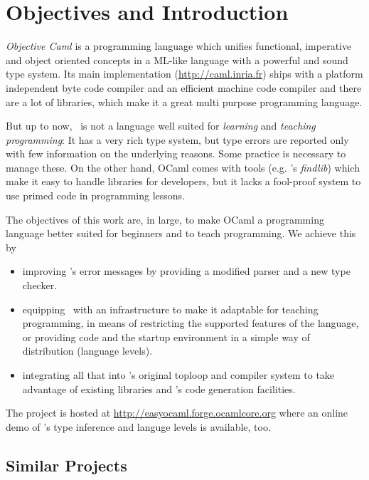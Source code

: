
\section{Objectives and Introduction}
\label{sec:intro}

\label{hd001}
\textsl{Objective Caml} \citep{leroy2008} is a programming language which unifies 
functional, imperative and object oriented concepts in a ML-like 
language with a powerful and sound type system.  Its main implementation 
(\url{http://caml.inria.fr}) ships with a platform independent byte code
compiler and an efficient machine code compiler and there are a lot of
libraries, which make it a great multi purpose programming language.

But up to now, \ocaml\ is not a language well suited for \emph{learning} and
\emph{teaching programming}:
It has a very rich type system, but type errors are reported only with few
information on the underlying reasons.
Some practice is necessary to manage these.
On the other hand, OCaml comes with tools (e.g.  \citeauthor{stolpmann}'s
\emph{findlib}) which make it easy to handle libraries for developers, but it
lacks a fool-proof system to use primed code in programming lessons.

The objectives of this work are, in large, to make OCaml a
programming language better suited for beginners and to teach programming. We
achieve this by

\begin{itemize}
    \item improving \ocaml's error messages by providing a modified 
        parser and a new type checker.
    \item equipping \ocaml\ with an infrastructure to make it 
        adaptable for teaching programming, in means of restricting the 
        supported features of the language, or providing code and the 
        startup environment in a simple way of distribution (language 
        levels).
    \item integrating all that into \ocaml's original toploop and 
        compiler system to take advantage of existing libraries and 
        \ocaml's code generation facilities.
\end{itemize}
The project is hosted at
\url{http://easyocaml.forge.ocamlcore.org}  where an online demo of \easyocaml's
type inference and languge levels is available, too.

\subsection{Similar Projects}

